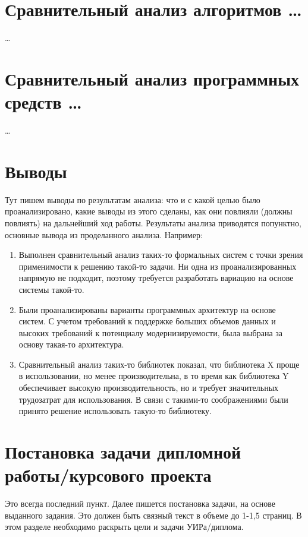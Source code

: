 \section{Сравнительный анализ алгоритмов \dots}

\dots





\section{Сравнительный анализ программных средств \dots}

\dots




\section{Выводы}

Тут пишем выводы по результатам анализа: что и с какой целью было проанализировано, какие выводы из этого сделаны, как они повлияли (должны повлиять) на дальнейший ход работы. Результаты анализа приводятся попунктно, основные вывода из проделанного анализа. Например:

\begin{enumerate}
	\item Выполнен сравнительный анализ таких-то формальных систем с точки зрения применимости к решению такой-то задачи. Ни одна из проанализированных напрямую не подходит, поэтому требуется разработать вариацию на основе системы такой-то.
	\item Были проанализированы варианты программных архитектур на основе систем. С учетом требований к поддержке больших объемов данных и высоких требований к потенциалу модернизируемости, была выбрана за основу такая-то архитектура.
	\item Сравнительный анализ таких-то библиотек показал, что библиотека X проще в использовании, но менее производительна, в то время как библиотека Y обеспечивает высокую производительность, но и требует значительных трудозатрат для использования. В связи с такими-то соображениями были принято решение использовать такую-то библиотеку.
\end{enumerate}



\section{Постановка задачи дипломной работы/курсового проекта}

Это всегда последний пункт. Далее пишется постановка задачи, на основе выданного задания. Это должен быть связный текст в объеме до 1-1,5 страниц. В этом разделе необходимо раскрыть цели и задачи УИРа/диплома. 

